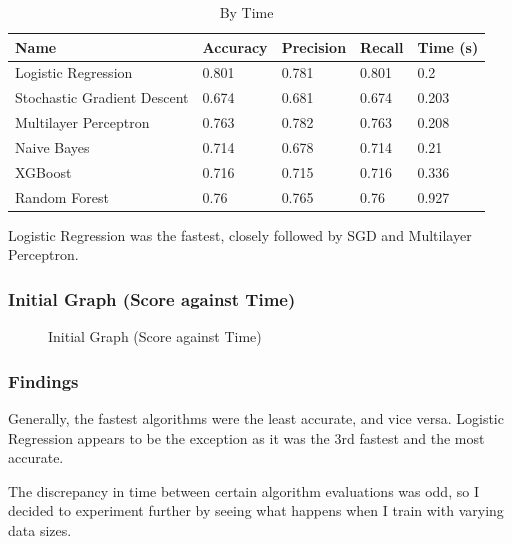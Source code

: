 \documentclass{article}
\begin{document}
\begin{table}[h!]
	\begin{center}
		\caption{By Time}
		\label{tab:table3}
		\begin{tabular}{l|l|l|l|l}
			\textbf{Name}               & \textbf{Accuracy} & \textbf{Precision} & \textbf{Recall} & \textbf{Time (s)} \\
			\hline
			Logistic Regression         & 0.801             & 0.781              & 0.801           & 0.2               \\
			Stochastic Gradient Descent & 0.674             & 0.681              & 0.674           & 0.203             \\
			Multilayer Perceptron       & 0.763             & 0.782              & 0.763           & 0.208             \\
			Naive Bayes                 & 0.714             & 0.678              & 0.714           & 0.21              \\
			XGBoost                     & 0.716             & 0.715              & 0.716           & 0.336             \\
			Random Forest               & 0.76              & 0.765              & 0.76            & 0.927             \\
		\end{tabular}
	\end{center}
\end{table}

Logistic Regression was the fastest, closely followed by SGD and Multilayer Perceptron.

\subsubsection{Initial Graph (Score against Time)}

\begin{figure}[H]
	\caption{Initial Graph (Score against Time)}
\end{figure}

\subsubsection{Findings}

Generally, the fastest algorithms were the least accurate, and vice versa.
Logistic Regression appears to be the exception as it was the 3rd fastest and the most accurate.

The discrepancy in time between certain algorithm evaluations was odd, so I decided to experiment further by seeing what happens when I train with varying data sizes.
\end{document}
